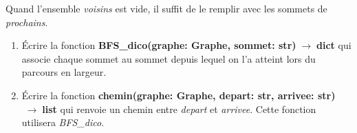 \documentclass[a4paper,11pt]{article}
\begin{document}
\begin{Form}
\begin{exo}
\begin{itemize}
\end{itemize}
Quand l'ensemble \emph{voisins} est vide, il suffit de le remplir avec les sommets de \emph{prochains}.
\begin{enumerate}
\item Écrire la fonction \textbf{BFS\_dico(graphe: Graphe, sommet: str)$\;\rightarrow\;$dict} qui associe chaque sommet au sommet depuis lequel on l'a atteint lors du parcours en largeur.
\item Écrire la fonction \textbf{chemin(graphe: Graphe, depart: str, arrivee: str)$\;\rightarrow\;$list} qui renvoie un chemin entre \emph{depart} et \emph{arrivee}. Cette fonction utilisera \emph{BFS\_dico}.
\end{enumerate}
\end{exo}
\end{Form}
\end{document}
